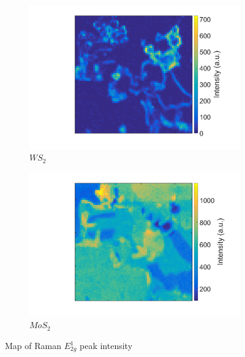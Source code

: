 \begin{figure}[h]
	\begin{center}
		\begin{subfigure}[b]{0.4\textwidth}
			\includegraphics[width=\textwidth]{Heterostructures/RamanIntensityMapEWS2.png}
			\caption{$WS_2$}
			\label{fig:HeterostructuresRamanIntensityEWS2}
		\end{subfigure}
		\begin{subfigure}[b]{0.4\textwidth}
			\includegraphics[width=\textwidth]{Heterostructures/RamanIntensityMapEMoS2.png}
			\caption{$MoS_2$}
			\label{fig:HeterostructuresRamanIntensityEMoS2}
		\end{subfigure}
		\caption{Map of Raman $E^1_{2g}$ peak intensity}
		\label{fig:HeterostructuresRamanIntensityE}
	\end{center}
\end{figure}

